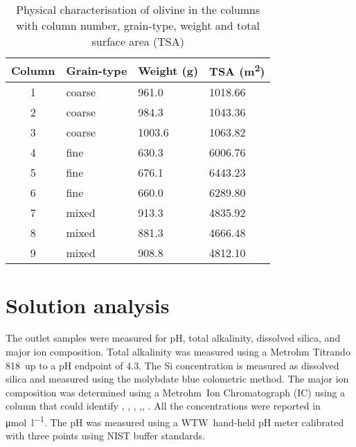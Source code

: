 \begin{table}[h]
  \centering
      \begin{tabular}{clll}
    \toprule
    \textbf{Column} & \textbf{Grain-type} & \textbf{Weight  (\si{\gram})} & \textbf{TSA (\si{m^2})} \\
    \midrule
    1     & coarse & 961.0 & 1018.66 \\
    2     & coarse & 984.3 & 1043.36 \\
    3     & coarse & 1003.6 & 1063.82 \\
    4     & fine  & 630.3 & 6006.76 \\
    5     & fine  & 676.1 & 6443.23 \\
    6     & fine  & 660.0 & 6289.80 \\
    7     & mixed & 913.3 & 4835.92 \\
    8     & mixed & 881.3 & 4666.48 \\
    9     & mixed & 908.8 & 4812.10 \\
    \bottomrule
    \end{tabular}
   \caption{Physical characterisation of olivine in the columns with column number, grain-type, weight and total surface area (TSA)}
  \label{tab:physicalcharacter}
\end{table}

\section{Solution analysis}
The outlet samples were measured for pH, total alkalinity, dissolved silica, and major ion composition. Total alkalinity was measured using a Metrohm Titrando 818\texttrademark\ up to a pH endpoint of \num{4.3}. The Si concentration is measured as dissolved silica  and measured using the molybdate blue colometric method. The major ion composition was determined using a Metrohm\texttrademark\ Ion Chromatograph (IC) using a column that could identify , , , ,, . All the concentrations were reported in \si{\micro\mole\per\litre}. The pH was measured using a WTW\texttrademark\ hand-held pH meter calibrated with three points using NIST buffer standards.
